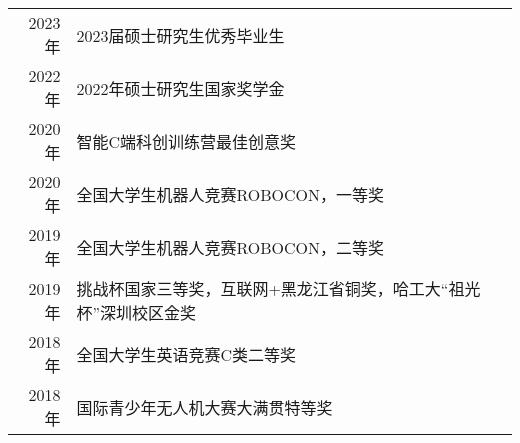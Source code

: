 %
%




\begin{tabular}{rl}	
	2023年 & 2023届硕士研究生优秀毕业生\\
	2022年 & 2022年硕士研究生国家奖学金 \\
	2020年 & 智能C端科创训练营最佳创意奖\\
	2020年 & 全国大学生机器人竞赛ROBOCON，一等奖\\
	2019年 & 全国大学生机器人竞赛ROBOCON，二等奖\\
	2019年 & 挑战杯国家三等奖，互联网+黑龙江省铜奖，哈工大“祖光杯”深圳校区金奖\\
	2018年 & 全国大学生英语竞赛C类二等奖\\
	2018年 & 国际青少年无人机大赛大满贯特等奖
\end{tabular}

